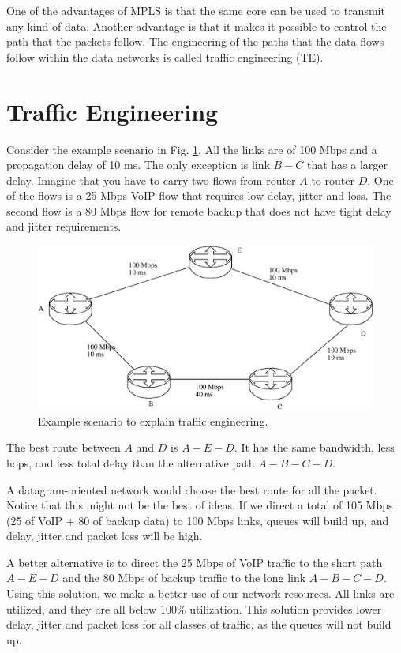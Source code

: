 One of the advantages of MPLS is that the same core can be used to transmit any kind of data.
Another advantage is that it makes it possible to control the path that the packets follow.
The engineering of the paths that the data flows follow within the data networks is called traffic engineering (TE).

\section{Traffic Engineering}

Consider the example scenario in Fig. \ref{fig:traffic-engineering}.
All the links are of 100 Mbps and a propagation delay of 10 ms.
The only exception is link $B-C$ that has a larger delay.
Imagine that you have to carry two flows from router $A$ to router $D$.
One of the flows is a 25 Mbps VoIP flow that requires low delay, jitter and loss.
The second flow is a 80 Mbps flow for remote backup that does not have tight delay and jitter requirements.

\begin{figure}[!h]
\centering
\includegraphics[width=\linewidth]{figures/traffic-engineering.eps}
\caption{Example scenario to explain traffic engineering.}
\label{fig:traffic-engineering}
\end{figure}

The best route between $A$ and $D$ is $A-E-D$.
It has the same bandwidth, less hops, and less total delay than the alternative path $A-B-C-D$.

A datagram-oriented network would choose the best route for all the packet.
Notice that this might not be the best of ideas.
If we direct a total of 105 Mbps (25 of VoIP + 80 of backup data) to 100 Mbps links, queues will build up, and delay, jitter and packet loss will be high.

A better alternative is to direct the 25 Mbps of VoIP traffic to the short path $A-E-D$ and the 80 Mbps of backup traffic to the long link $A-B-C-D$.
Using this solution, we make a better use of our network resources.
All links are utilized, and they are all below 100\% utilization.
This solution provides lower delay, jitter and packet loss for all classes of traffic, as the queues will not build up.

